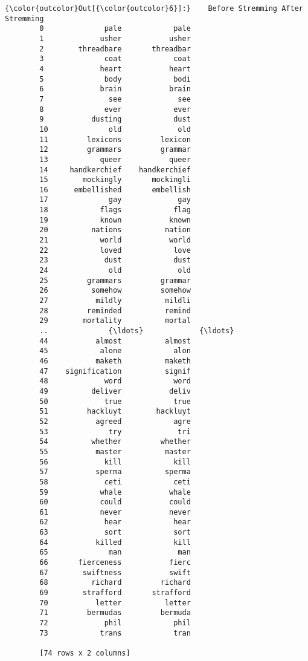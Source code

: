 \documentclass[11pt]{article}
\begin{document}
\begin{Verbatim}[commandchars=\\\{\}]
{\color{outcolor}Out[{\color{outcolor}6}]:}    Before Stremming After Stremming
        0              pale            pale
        1             usher           usher
        2        threadbare       threadbar
        3              coat            coat
        4             heart           heart
        5              body            bodi
        6             brain           brain
        7               see             see
        8              ever            ever
        9           dusting            dust
        10              old             old
        11         lexicons         lexicon
        12         grammars         grammar
        13            queer           queer
        14     handkerchief    handkerchief
        15        mockingly       mockingli
        16      embellished       embellish
        17              gay             gay
        18            flags            flag
        19            known           known
        20          nations          nation
        21            world           world
        22            loved            love
        23             dust            dust
        24              old             old
        25         grammars         grammar
        26          somehow         somehow
        27           mildly          mildli
        28         reminded          remind
        29        mortality          mortal
        ..              {\ldots}             {\ldots}
        44           almost          almost
        45            alone            alon
        46           maketh          maketh
        47    signification          signif
        48             word            word
        49          deliver           deliv
        50             true            true
        51         hackluyt        hackluyt
        52           agreed            agre
        53              try             tri
        54          whether         whether
        55           master          master
        56             kill            kill
        57           sperma          sperma
        58             ceti            ceti
        59            whale           whale
        60            could           could
        61            never           never
        62             hear            hear
        63             sort            sort
        64           killed            kill
        65              man             man
        66       fierceness           fierc
        67        swiftness           swift
        68          richard         richard
        69        strafford       strafford
        70           letter          letter
        71         bermudas         bermuda
        72             phil            phil
        73            trans            tran
        
        [74 rows x 2 columns]
\end{Verbatim}
            
\end{document}

